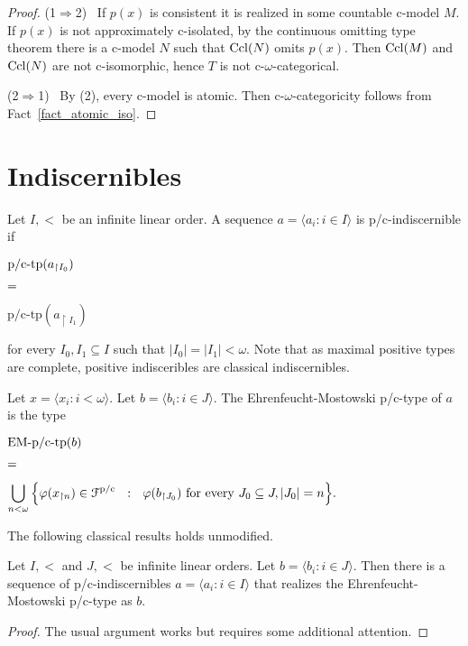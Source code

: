 \documentclass{amsproc}
\begin{document}
{\begin{proof}
  (1$\Rightarrow$2) \ 
  If $p(x)$ is consistent it is realized in some countable c-model $M$.
  If $p(x)$ is not approximately c-isolated, by the continuous omitting type theorem there is a c-model $N$ such that  ${\rm Ccl}(N)$ omits $p(x)$.
  Then ${\rm Ccl}(M)$ and ${\rm Ccl}(N)$ are not c-isomorphic, hence $T$ is not c-$\omega$-categorical.

  (2$\Rightarrow$1) \ 
  By (2), every c-model is atomic.
  Then c-$\omega$-categoricity follows from Fact~\ref{fact_atomic_iso}.
\end{proof}

\section{Indiscernibles}

\def\ceq#1#2#3{\parbox[t]{15ex}{$\displaystyle #1$}\parbox[t]{6ex}{$\displaystyle\hfil #2$}{$\displaystyle #3$}}

Let $I,<$ be an infinite linear order.
A sequence $a=\langle a_i:i\in I\rangle$ is p/c-indiscernible if 

\ceq{\hfill\mbox{p/c-tp}(a_{\restriction I_0})}{=}{\mbox{p/c-tp}(a_{\restriction I_1})}

for every $I_0,I_1\subseteq I$ such that $|I_0|=|I_1|<\omega$.
Note that as maximal positive types are complete, positive indisceribles are classical indiscernibles.

Let $x=\langle x_i:i<\omega\rangle$.
Let $b=\langle b_i:i\in J\rangle$. 
The Ehrenfeucht-Mostowski p/c-type of $a$ is the type

\ceq{\hfill\mbox{EM-p/c-tp}(b)}{=}{\bigcup_{n<\omega}\Big\{\varphi(x_{\restriction n})\in{\EuScript F}^{\rm p/c}\ \ :\ \ \varphi(b_{\restriction J_0})\textrm{ for every } J_0\subseteq J, |J_0|=n\Big\}.}

The following classical results holds unmodified.

\begin{theorem}\label{thm_EM}
  Let $I,<$ and $J,<$ be infinite linear orders.
  Let $b=\langle b_i:i\in J\rangle$.
  Then there is a sequence of p/c-indiscernibles $a=\langle a_i:i\in I\rangle$ that realizes the Ehrenfeucht-Mostowski p/c-type as $b$.
\end{theorem}

\begin{proof}
  The usual argument works but requires some additional attention.


\end{proof}}
\end{document}
